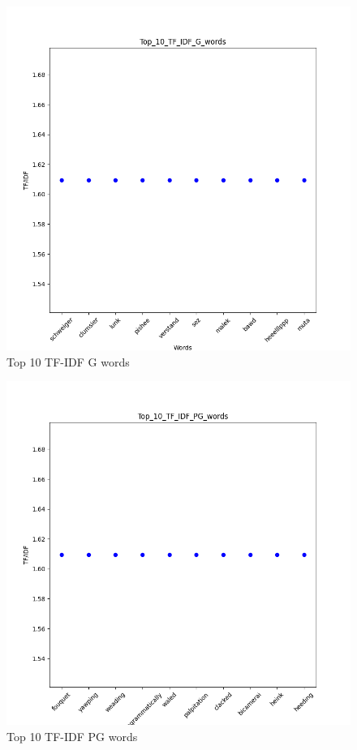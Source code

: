 \documentclass[a4paper]{article}
\begin{document}
\begin{figure}[ht]
    \centering
    \includegraphics[width=1\textwidth]{../stats/Top_10_TF_IDF_G_words.png}
    \caption{Top 10 TF-IDF G words}
\end{figure}

\begin{figure}[ht]
    \centering
    \includegraphics[width=1\textwidth]{../stats/Top_10_TF_IDF_PG_words.png}
    \caption{Top 10 TF-IDF PG words}
\end{figure}
\end{document}
